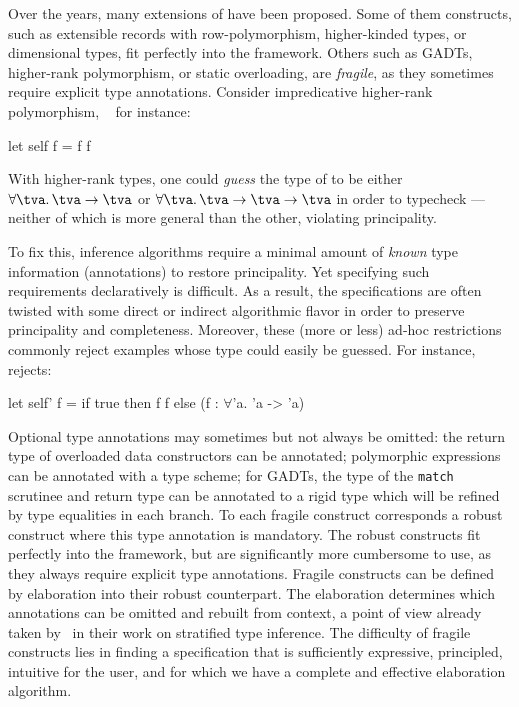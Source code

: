 \documentclass[acmsmall,screen,nonacm]{acmart}
\begin{document}

Over the years, many extensions of \ML have been proposed. Some of them
constructs, such as extensible records with row-polymorphism, higher-kinded
types, or dimensional types, fit perfectly into the \ML framework. Others such
as GADTs, higher-rank polymorphism, or static overloading, are
\emph{fragile}, as they sometimes require explicit type
annotations.
%
Consider impredicative higher-rank polymorphism,
\MLF~\cite{LeBotlan-Remy/recasting-mlf} for instance:
\begin{program}[input]
  let self f = f f
\end{program}
With higher-rank types, one could \emph{guess} the type of  to be
either $\tfor \tv \tv \to \tv$ or $\tfor \tv \tv \to \tv \to \tv$ in order
to typecheck ---neither of which is more general than the other,
violating principality.


To fix this, inference algorithms require a minimal amount of \emph{known}
type information (\ie annotations) to restore principality. Yet specifying
such requirements declaratively is difficult. As a result, the specifications
are often twisted with some direct or indirect algorithmic flavor in order to
preserve principality and completeness.
%
Moreover, these (more or less) ad-hoc restrictions commonly reject examples
whose type could easily be guessed. For instance, \MLF~ rejects:
\begin{program}[input]
  let self' f = if true then f f else (f : $\forall$'a. 'a -> 'a)
\end{program}


Optional type annotations may sometimes but not always be omitted: the
return type of overloaded data constructors can be annotated; polymorphic
expressions can be annotated with a type scheme; for GADTs, the type of the
\texttt{match} scrutinee and return type can be annotated to a rigid type
which will be
refined by type equalities in each branch. To each fragile construct
corresponds a robust construct where this type annotation is mandatory. The
robust constructs fit perfectly into the \ML framework, but are
significantly more cumbersome to use, as they always require explicit type
annotations.  Fragile constructs can be defined by elaboration into their
robust counterpart. The elaboration determines which annotations can be
omitted and rebuilt from context, a point of view already taken by~\citet
{Pottier-Regis-Gianas/stratified@popl06} in their work on stratified type
inference.
%
The difficulty of fragile constructs lies in finding a specification
that is sufficiently expressive, principled, intuitive for the user,
and for which we have a complete and effective elaboration algorithm.
\end{document}

